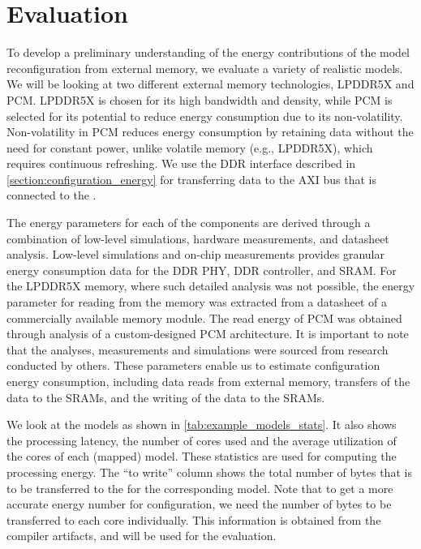 \section{Evaluation}
\label{section:energy_evaluation}
To develop a preliminary understanding of the energy contributions of the model reconfiguration from external memory, we evaluate a variety of realistic models.
We will be looking at two different external memory technologies, LPDDR5X and PCM.
LPDDR5X is chosen for its high bandwidth and density, while PCM is selected for its potential to reduce energy consumption due to its non-volatility.
Non-volatility in PCM reduces energy consumption by retaining data without the need for constant power, unlike volatile memory (e.g., LPDDR5X), which requires continuous refreshing.
We use the DDR interface described in \cref{section:configuration_energy} for transferring data to the AXI bus that is connected to the \graicore{}.

The energy parameters for each of the components are derived through a combination of low-level simulations, hardware measurements, and datasheet analysis.
Low-level simulations and on-chip measurements provides granular energy consumption data for the DDR PHY, DDR controller, \confignoc{} and SRAM.
For the LPDDR5X memory, where such detailed analysis was not possible, the energy parameter for reading from the memory was extracted from a datasheet of a commercially available memory module.
The read energy of PCM was obtained through analysis of a custom-designed PCM architecture.
It is important to note that the analyses, measurements and simulations were sourced from research conducted by others.
These parameters enable us to estimate configuration energy consumption, including data reads from external memory, transfers of the data to the SRAMs, and the writing of the data to the SRAMs.

We look at the models as shown in \cref{tab:example_models_stats}.
It also shows the processing latency, the number of cores used and the average utilization of the cores of each (mapped) model.
These statistics are used for computing the processing energy.
The ``to write'' column shows the total number of bytes that is to be transferred to the \graicore{} for the corresponding model.
Note that to get a more accurate energy number for configuration, we need the number of bytes to be transferred to each core individually.
This information is obtained from the compiler artifacts, and will be used for the evaluation.

